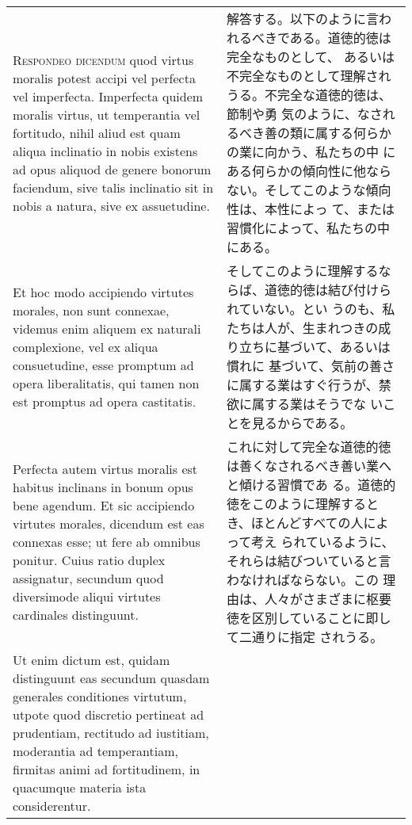 \documentclass[10pt]{jsarticle}
\begin{document}
\begin{longtable}{p{21em}p{21em}}
\\




{\scshape Respondeo dicendum} quod virtus moralis potest accipi vel
perfecta vel imperfecta. Imperfecta quidem moralis virtus, ut
temperantia vel fortitudo, nihil aliud est quam aliqua inclinatio in
nobis existens ad opus aliquod de genere bonorum faciendum, sive talis
 inclinatio sit in nobis a natura, sive ex assuetudine.


&

 解答する。以下のように言われるべきである。道徳的徳は完全なものとして、
 あるいは不完全なものとして理解されうる。不完全な道徳的徳は、節制や勇
 気のように、なされるべき善の類に属する何らかの業に向かう、私たちの中
 にある何らかの傾向性に他ならない。そしてこのような傾向性は、本性によっ
 て、または習慣化によって、私たちの中にある。

\\

 Et hoc modo accipiendo virtutes morales, non sunt connexae, videmus
enim aliquem ex naturali complexione, vel ex aliqua consuetudine, esse
promptum ad opera liberalitatis, qui tamen non est promptus ad opera
castitatis.


&

 そしてこのように理解するならば、道徳的徳は結び付けられていない。とい
 うのも、私たちは人が、生まれつきの成り立ちに基づいて、あるいは慣れに
 基づいて、気前の善さに属する業はすぐ行うが、禁欲に属する業はそうでな
 いことを見るからである。

\\


 Perfecta autem virtus moralis est habitus inclinans in bonum opus
 bene agendum. Et sic accipiendo virtutes morales, dicendum est eas
 connexas esse; ut fere ab omnibus ponitur. Cuius ratio duplex
 assignatur, secundum quod diversimode aliqui virtutes cardinales
 distinguunt.

&

 これに対して完全な道徳的徳は善くなされるべき善い業へと傾ける習慣であ
 る。道徳的徳をこのように理解するとき、ほとんどすべての人によって考え
 られているように、それらは結びついていると言わなければならない。この
 理由は、人々がさまざまに枢要徳を区別していることに即して二通りに指定
 されうる。

\\

 Ut enim dictum est, quidam distinguunt eas secundum quasdam generales
 conditiones virtutum, utpote quod discretio pertineat ad prudentiam,
 rectitudo ad iustitiam, moderantia ad temperantiam, firmitas animi ad
 fortitudinem, in quacumque materia ista considerentur. 


\end{longtable}
\end{document}
